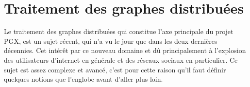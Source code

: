 \chapter{Traitement des graphes distribuées}
Le traitement des graphes distribuées qui constitue l’axe principale du projet PGX, est un sujet récent, qui n’a vu le jour que dans les deux dernières décennies. Cet intérêt par ce nouveau domaine et dû principalement à l’explosion des utilisateurs d’internet en générale et des réseaux sociaux en particulier. Ce sujet est assez complexe et avancé, c’est pour cette raison qu’il faut définir quelques notions que l’englobe avant d’aller plus loin.\\




